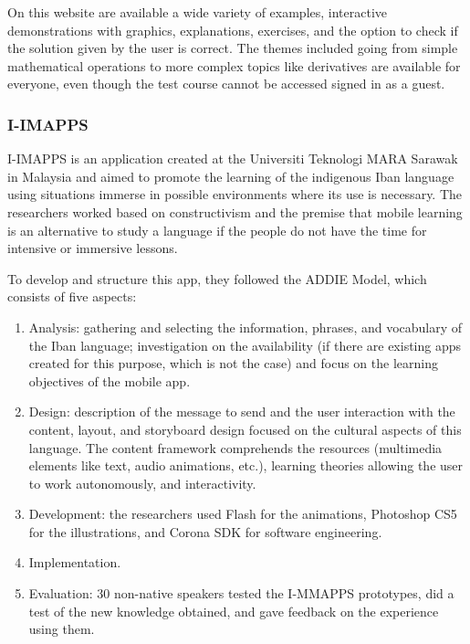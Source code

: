 On this website are available a wide variety of examples, interactive demonstrations with graphics, explanations, exercises, and the option to check if the solution given by the user is correct. The themes included going from simple mathematical operations to more complex topics like derivatives are available for everyone, even though the test course cannot be accessed signed in as a guest.

\subsubsection{I-IMAPPS}

I-IMAPPS is an application created at the Universiti Teknologi MARA Sarawak in Malaysia and aimed to promote the learning of the indigenous Iban language using situations immerse in possible environments where its use is necessary. The researchers worked based on constructivism and the premise that mobile learning is an alternative to study a language if the people do not have the time for intensive or immersive lessons. 


To develop and structure this app, they followed the ADDIE Model, which consists of five aspects: 

\begin{enumerate}
    \item Analysis: gathering and selecting the information, phrases, and vocabulary of the Iban language; investigation on the availability (if there are existing apps created for this purpose, which is not the case) and focus on the learning objectives of the mobile app.
    \item Design: description of the message to send and the user interaction with the content, layout, and storyboard design focused on the cultural aspects of this language. The content framework comprehends the resources (multimedia elements like text, audio animations, etc.), learning theories allowing the user to work autonomously, and interactivity.
    
    \item Development: the researchers used Flash for the animations, Photoshop CS5  for the illustrations, and Corona SDK for software engineering. 

    
    \item Implementation.
    
    \item Evaluation: 30 non-native speakers tested the I-MMAPPS prototypes, did a test of the new knowledge obtained, and gave feedback on the experience using them.
    
\end{enumerate}

